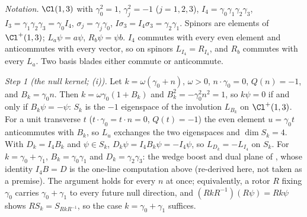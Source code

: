 \emph{Notation.} $\Cl(1,3)$ with $\gamma_{0}^{2} = 1$, $\gamma_{j}^{2} = -1$ ($j = 1, 2, 3$), $I_{4} = \gamma_{0}\gamma_{1}\gamma_{2}\gamma_{3}$, $I_{3} = \gamma_{1}\gamma_{2}\gamma_{3} = \gamma_{0}I_{4}$, $\sigma_{j} = \gamma_{j}\gamma_{0}$, $I\sigma_{3} = I_{4}\sigma_{3} = \gamma_{2}\gamma_{1}$. Spinors are elements of $\Cl^{+}(1,3)$; $L_{a}\psi = a\psi$, $R_{b}\psi = \psi b$. $I_{4}$ commutes with every even element and anticommutes with every vector, so on spinors $L_{I_{4}} = R_{I_{4}}$, and $R_{b}$ commutes with every $L_{a}$. Two basis blades either commute or anticommute.

\emph{Step 1 (the null kernel; (i)).} Let $k = \omega(\gamma_{0} + n)$, $\omega > 0$, $n \cdot \gamma_{0} = 0$, $Q(n) = -1$, and $B_{k} = \gamma_{0}n$. Then $k = \omega\gamma_{0}(1 + B_{k})$ and $B_{k}^{2} = -\gamma_{0}^{2}n^{2} = 1$, so $k\psi = 0$ if and only if $B_{k}\psi = -\psi$: $S_{k}$ is the $-1$ eigenspace of the involution $L_{B_{k}}$ on $\Cl^{+}(1,3)$. For a unit transverse $t$ ($t \cdot \gamma_{0} = t \cdot n = 0$, $Q(t) = -1$) the even element $u = \gamma_{0}t$ anticommutes with $B_{k}$, so $L_{u}$ exchanges the two eigenspaces and $\dim S_{k} = 4$. With $D_{k} = I_{4}B_{k}$ and $\psi \in S_{k}$, $D_{k}\psi = I_{4}B_{k}\psi = -I_{4}\psi$, so $L_{D_{k}} = -L_{I_{4}}$ on $S_{k}$. For $k = \gamma_{0} + \gamma_{1}$, $B_{k} = \gamma_{0}\gamma_{1}$ and $D_{k} = \gamma_{2}\gamma_{3}$: the wedge boost and dual plane of , whose identity $I_{4}B = D$ is the one-line computation above (re-derived here, not taken as a premise). The argument holds for every $n$ at once; equivalently, a rotor $R$ fixing $\gamma_{0}$ carries $\gamma_{0} + \gamma_{1}$ to every future null direction, and $(RkR^{-1})(R\psi) = Rk\psi$ shows $RS_{k} = S_{RkR^{-1}}$, so the case $k = \gamma_{0} + \gamma_{1}$ suffices.

